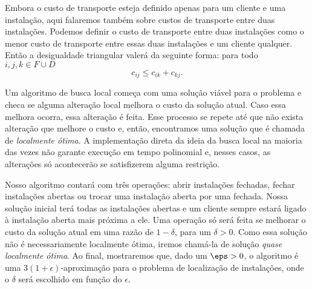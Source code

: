 Embora o custo de transporte esteja definido apenas para um cliente e uma instalação, aqui falaremos também sobre custos de transporte entre duas instalações. Podemos definir o custo de transporte entre duas instalações como o menor custo de transporte entre essas duas instalações e um cliente qualquer. Então a desigualdade triangular valerá da seguinte forma: para todo $i,j,k \in F \cup D$ 
\[ c_{ij} \leq c_{ik} + c_{kj}.\]

Um algoritmo de busca local começa com uma solução viável para o problema e checa se alguma alteração local melhora o custo da solução atual. Caso essa melhora ocorra, essa alteração é feita. Esse processo se repete até que não exista alteração que melhore o custo e, então, encontramos uma solução que é chamada de \emph{localmente ótima}. A implementação direta da ideia da busca local na maioria das vezes não garante execução em tempo polinomial e, nesses casos, as alterações só acontecerão se satisfizerem alguma restrição. 

Nosso algoritmo contará com três operações: abrir instalações fechadas, fechar instalações abertas ou trocar uma instalação aberta por uma fechada. Nossa solução inicial terá todas as instalações abertas e um cliente sempre estará ligado à instalação aberta mais próxima a ele. Uma operação só será feita se melhorar o custo da solução atual em uma razão de $1-\delta$, para um $\delta>0$. Como essa solução não é necessariamente localmente ótima, iremos chamá-la de solução \emph{quase localmente ótima}. Ao final, mostraremos que, dado um $\eps > 0$, o algoritmo é uma $3(1 + \epsilon)$-aproximação para o problema de localização de instalações, onde o $\delta$ será escolhido em função do $\epsilon$.

